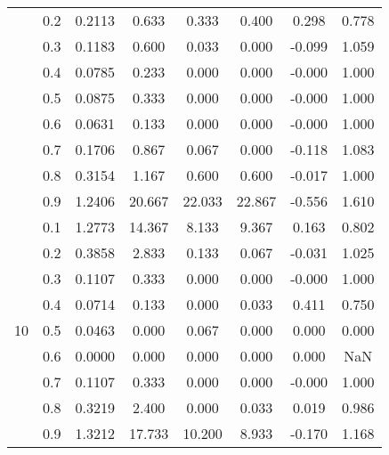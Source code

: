 \documentclass[11pt,a4paper]{report}
\begin{document}
\begin{longtable}{ | c | c || c | c | c | c | c | c | }
 & 0.2 & 0.2113 & 0.633 & 0.333 & 0.400 & 0.298 & 0.778 \\
 & 0.3 & 0.1183 & 0.600 & 0.033 & 0.000 & -0.099 & 1.059 \\
 & 0.4 & 0.0785 & 0.233 & 0.000 & 0.000 & -0.000 & 1.000 \\
 & 0.5 & 0.0875 & 0.333 & 0.000 & 0.000 & -0.000 & 1.000 \\
 & 0.6 & 0.0631 & 0.133 & 0.000 & 0.000 & -0.000 & 1.000 \\
 & 0.7 & 0.1706 & 0.867 & 0.067 & 0.000 & -0.118 & 1.083 \\
 & 0.8 & 0.3154 & 1.167 & 0.600 & 0.600 & -0.017 & 1.000 \\
 & 0.9 & 1.2406 & 20.667 & 22.033 & 22.867 & -0.556 & 1.610 \\
 \hline
\multirow{9}{*}{10} & 0.1 & 1.2773 & 14.367 & 8.133 & 9.367 & 0.163 & 0.802 \\
 & 0.2 & 0.3858 & 2.833 & 0.133 & 0.067 & -0.031 & 1.025 \\
 & 0.3 & 0.1107 & 0.333 & 0.000 & 0.000 & -0.000 & 1.000 \\
 & 0.4 & 0.0714 & 0.133 & 0.000 & 0.033 & 0.411 & 0.750 \\
 & 0.5 & 0.0463 & 0.000 & 0.067 & 0.000 & 0.000 & 0.000 \\
 & 0.6 & 0.0000 & 0.000 & 0.000 & 0.000 & 0.000 & NaN \\
 & 0.7 & 0.1107 & 0.333 & 0.000 & 0.000 & -0.000 & 1.000 \\
 & 0.8 & 0.3219 & 2.400 & 0.000 & 0.033 & 0.019 & 0.986 \\
 & 0.9 & 1.3212 & 17.733 & 10.200 & 8.933 & -0.170 & 1.168 \\
 \hline
\hline
\end{longtable}
\end{document}
